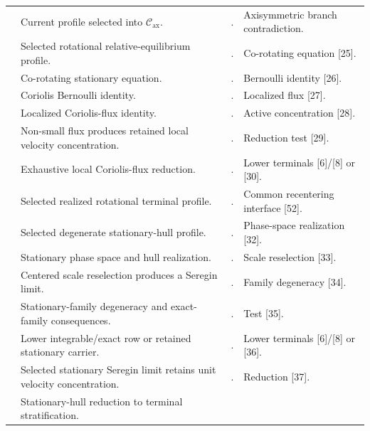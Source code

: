 \documentclass[11pt]{amsart}
\numberwithin{equation}{section}
\theoremstyle{plain}
\theoremstyle{definition}
\theoremstyle{remark}
\newcommand{\Cax}{\mathcal C_{\mathrm{ax}}}
\begin{document}
\begin{longtable}{@{}L{0.06\textwidth}L{0.25\textwidth}L{0.40\textwidth}L{0.21\textwidth}@{}}
\relax
[23] & Current profile selected into \(\Cax\). &
. &
Axisymmetric branch contradiction.\\
\relax
[24] & Selected rotational relative-equilibrium profile. &
. & Co-rotating equation [25].\\
\relax
[25] & Co-rotating stationary equation. &
. & Bernoulli identity [26].\\
\relax
[26] & Coriolis Bernoulli identity. &
. & Localized flux [27].\\
\relax
[27] & Localized Coriolis-flux identity. &
. & Active concentration [28].\\
\relax
[28] & Non-small flux produces retained local velocity concentration. &
. & Reduction test [29].\\
\relax
[29] & Exhaustive local Coriolis-flux reduction. &
. &
Lower terminals [6]/[8] or [30].\\
\relax
[30] & Selected realized rotational terminal profile. &
. & Common recentering interface [52].\\
\relax
[31] & Selected degenerate stationary-hull profile. &
. & Phase-space realization [32].\\
\relax
[32] & Stationary phase space and hull realization. &
. & Scale reselection [33].\\
\relax
[33] & Centered scale reselection produces a Seregin limit. &
. & Family degeneracy [34].\\
\relax
[34] & Stationary-family degeneracy and exact-family consequences. &
. & Test [35].\\
\relax
[35] & Lower integrable/exact row or retained stationary carrier. &
. &
Lower terminals [6]/[8] or [36].\\
\relax
[36] & Selected stationary Seregin limit retains unit velocity concentration. &
. & Reduction [37].\\
\relax
[37] & Stationary-hull reduction to terminal stratification. &

\end{longtable}
\end{document}
